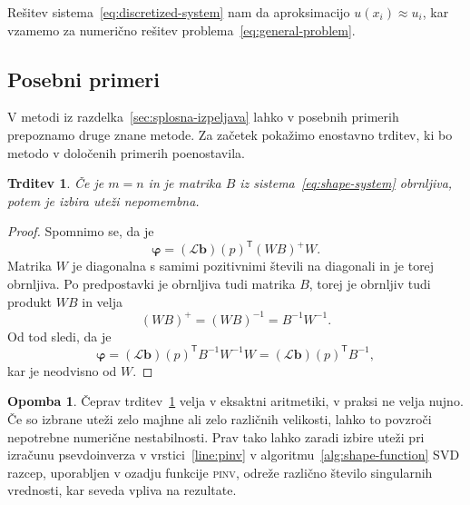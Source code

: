 \documentclass[12pt,a4paper,twoside]{article}
\theoremstyle{definition} %
\newtheorem{opomba}[definicija]{Opomba}
\theoremstyle{plain} %
\newtheorem{trditev}[definicija]{Trditev}
\numberwithin{equation}{section}
\renewcommand{\L}{\mathcal{L}}
\newcommand{\T}{\mathsf{T}}
\renewcommand{\b}{\boldsymbol}
\renewcommand{\phi}{\varphi}
\begin{document}
Rešitev sistema~\eqref{eq:discretized-system} nam da aproksimacijo $u(x_i) \approx u_i$, kar vzamemo
za numerično rešitev problema~\eqref{eq:general-problem}.

\subsection{Posebni primeri}
\label{sec:posebni-primeri}
V metodi iz razdelka~\ref{sec:splosna-izpeljava} lahko v posebnih primerih prepoznamo druge znane
metode. Za začetek pokažimo enostavno trditev, ki bo metodo v določenih primerih poenostavila.
\begin{trditev}
  \label{trd:weight-independence}
  Če je $m = n$ in je matrika $B$ iz sistema~\eqref{eq:shape-system} obrnljiva,
  potem je izbira uteži nepomembna.
\end{trditev}
\begin{proof}
Spomnimo se, da je \[
  \b\phi = (\L\b{b})(p)^\T(WB)^{+}W.
\]
Matrika $W$ je diagonalna s samimi pozitivnimi števili na diagonali in je torej
obrnljiva. Po predpostavki je obrnljiva tudi matrika $B$, torej je obrnljiv tudi
produkt $WB$ in velja
\[
  (WB)^+ = (WB)^{-1} = B^{-1}W^{-1}.
\]
Od tod sledi, da je
\[
  \b\phi = (\L\b{b})(p)^\T B^{-1} W^{-1} W = (\L\b{b})(p)^\T B^{-1},
\]
kar je neodvisno od $W$.
\end{proof}
\begin{opomba}
  Čeprav trditev~\ref{trd:weight-independence} velja v eksaktni aritmetiki, v
  praksi ne velja nujno. Če so izbrane uteži zelo majhne ali zelo različnih
  velikosti, lahko to povzroči nepotrebne numerične nestabilnosti. Prav tako
  lahko zaradi izbire uteži pri izračunu psevdoinverza v vrstici~\ref{line:pinv}
  v algoritmu~\ref{alg:shape-function} SVD razcep, uporabljen v ozadju
  funkcije \textsc{pinv}, odreže različno število singularnih vrednosti,
  kar seveda vpliva na rezultate.
\end{opomba}
\end{document}

